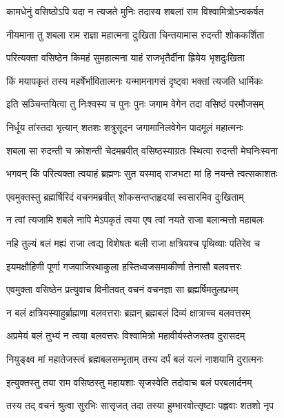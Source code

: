 
\twolineshloka
{कामधेनुं वसिष्ठोऽपि यदा न त्यजते मुनिः}
{तदास्य शबलां राम विश्वामित्रोऽन्वकर्षत} %

\twolineshloka
{नीयमाना तु शबला राम राज्ञा महात्मना}
{दुःखिता चिन्तयामास रुदन्ती शोककर्शिता} %

\twolineshloka
{परित्यक्ता वसिष्ठेन किमहं सुमहात्मना}
{याहं राजभृतैर्दीना ह्रियेय भृशदुःखिता} %

\twolineshloka
{किं मयापकृतं तस्य महर्षेर्भावितात्मनः}
{यन्मामनागसं दृष्ट्वा भक्तां त्यजति धार्मिकः} %

\twolineshloka
{इति सञ्चिन्तयित्वा तु निःश्वस्य च पुनः पुनः}
{जगाम वेगेन तदा वसिष्ठं परमौजसम्} %

\twolineshloka
{निर्धूय तांस्तदा भृत्यान् शतशः शत्रुसूदन}
{जगामानिलवेगेन पादमूलं महात्मनः} %

\twolineshloka
{शबला सा रुदन्ती च क्रोशन्ती चेदमब्रवीत्}
{वसिष्ठस्याग्रतः स्थित्वा रुदन्ती मेघनिःस्वना} %

\twolineshloka
{भगवन् किं परित्यक्ता त्वयाहं ब्रह्मणः सुत}
{यस्माद् राजभटा मां हि नयन्ते त्वत्सकाशतः} %

\twolineshloka
{एवमुक्तस्तु ब्रह्मर्षिरिदं वचनमब्रवीत्}
{शोकसन्तप्तहृदयां स्वसारमिव दुःखिताम्} %

\twolineshloka
{न त्वां त्यजामि शबले नापि मेऽपकृतं त्वया}
{एष त्वां नयते राजा बलान्मत्तो महाबलः} %

\twolineshloka
{नहि तुल्यं बलं मह्यं राजा त्वद्य विशेषतः}
{बली राजा क्षत्रियश्च पृथिव्याः पतिरेव च} %

\twolineshloka
{इयमक्षौहिणी पूर्णा गजवाजिरथाकुला}
{हस्तिध्वजसमाकीर्णा तेनासौ बलवत्तरः} %

\twolineshloka
{एवमुक्ता वसिष्ठेन प्रत्युवाच विनीतवत्}
{वचनं वचनज्ञा सा ब्रह्मर्षिमतुलप्रभम्} %

\twolineshloka
{न बलं क्षत्रियस्याहुर्ब्राह्मणा बलवत्तराः}
{ब्रह्मन् ब्रह्मबलं दिव्यं क्षात्राच्च बलवत्तरम्} %

\twolineshloka
{अप्रमेयं बलं तुभ्यं न त्वया बलवत्तरः}
{विश्वामित्रो महावीर्यस्तेजस्तव दुरासदम्} %

\twolineshloka
{नियुङ्क्ष्व मां महातेजस्त्वं ब्रह्मबलसम्भृताम्}
{तस्य दर्पं बलं यत्नं नाशयामि दुरात्मनः} %

\twolineshloka
{इत्युक्तस्तु तया राम वसिष्ठस्तु महायशाः}
{सृजस्वेति तदोवाच बलं परबलार्दनम्} %

\twolineshloka
{तस्य तद् वचनं श्रुत्वा सुरभिः सासृजत् तदा}
{तस्या हुम्भारवोत्सृष्टाः पह्लवाः शतशो नृप} %


